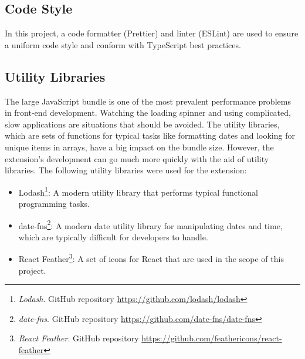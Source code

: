 \subsection{Code Style}
In this project, a code formatter (Prettier) and linter (ESLint) are used to ensure a uniform code style and conform with TypeScript best practices.

\subsection{Utility Libraries}
The large JavaScript bundle is one of the most prevalent performance problems in front-end development. Watching the loading spinner and using complicated, slow applications are situations that should be avoided. The utility libraries, which are sets of functions for typical tasks like formatting dates and looking for unique items in arrays, have a big impact on the bundle size. However, the extension's development can go much more quickly with the aid of utility libraries. The following utility libraries were used for the extension:

\begin{itemize}
  \item Lodash\footnote{\emph{Lodash}. GitHub repository \url{https://github.com/lodash/lodash}}: A modern utility library that performs typical functional programming tasks.
  \item date-fns\footnote{\emph{date-fns}. GitHub repository \url{https://github.com/date-fns/date-fns}}: A modern date utility library for manipulating dates and time, which are typically difficult for developers to handle.
  \item React Feather\footnote{\emph{React Feather}. GitHub repository \url{https://github.com/feathericons/react-feather}}: A set of icons for React that are used in the scope of this project.
\end{itemize}

